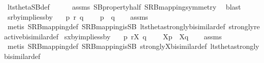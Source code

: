 \begin{isabellebody}
\ lts{\isacharunderscore}{\kern0pt}theta{\isachardot}{\kern0pt}SB{\isacharunderscore}{\kern0pt}def\isanewline
\ \ \ \ \isamarkupfalse%
\ assms\ SB{\isacharunderscore}{\kern0pt}property{\isacharunderscore}{\kern0pt}half\ SRB{\isacharunderscore}{\kern0pt}mapping{\isacharunderscore}{\kern0pt}symmetry\ \isamarkupfalse%
\ blast\isanewline
{}\isamarkupfalse%
%
\endisatagproof
{\isafoldproof}%
%
\isadelimproof
\isanewline
%
\endisadelimproof
\isanewline
{}\isamarkupfalse%
\ srby{\isacharunderscore}{\kern0pt}implies{\isacharunderscore}{\kern0pt}sby{\isacharcolon}{\kern0pt}\isanewline
\ \ \ {\isacartoucheopen}p\ {\isasymleftrightarrow}\isactrlsub r\ q{\isacartoucheclose}\ \isanewline
\ \ \ {\isacartoucheopen}{\isasymtheta}{\isacharparenleft}{\kern0pt}p{\isacharparenright}{\kern0pt}\ {\isasymleftrightarrow}\ {\isasymtheta}{\isacharparenleft}{\kern0pt}q{\isacharparenright}{\kern0pt}{\isacartoucheclose}\isanewline
%
\isadelimproof
\ \ %
\endisadelimproof
%
\isatagproof
{}\isamarkupfalse%
\ assms\isanewline
\ \ \isamarkupfalse%
\ {\isacharparenleft}{\kern0pt}metis\ SRB{\isacharunderscore}{\kern0pt}mapping{\isacharunderscore}{\kern0pt}def\ SRB{\isacharunderscore}{\kern0pt}mapping{\isacharunderscore}{\kern0pt}is{\isacharunderscore}{\kern0pt}SB\ lts{\isacharunderscore}{\kern0pt}theta{\isachardot}{\kern0pt}strongly{\isacharunderscore}{\kern0pt}bisimilar{\isacharunderscore}{\kern0pt}def\ strongly{\isacharunderscore}{\kern0pt}reactive{\isacharunderscore}{\kern0pt}bisimilar{\isacharunderscore}{\kern0pt}def{\isacharparenright}{\kern0pt}%
\endisatagproof
{\isafoldproof}%
%
\isadelimproof
\isanewline
%
\endisadelimproof
\isanewline
{}\isamarkupfalse%
\ sxby{\isacharunderscore}{\kern0pt}implies{\isacharunderscore}{\kern0pt}sby{\isacharcolon}{\kern0pt}\isanewline
\ \ \ {\isacartoucheopen}p\ {\isasymleftrightarrow}\isactrlsub r\isactrlsup X\ q{\isacartoucheclose}\ \isanewline
\ \ \ {\isacartoucheopen}{\isasymtheta}{\isacharbrackleft}{\kern0pt}X{\isacharbrackright}{\kern0pt}{\isacharparenleft}{\kern0pt}p{\isacharparenright}{\kern0pt}\ {\isasymleftrightarrow}\ {\isasymtheta}{\isacharbrackleft}{\kern0pt}X{\isacharbrackright}{\kern0pt}{\isacharparenleft}{\kern0pt}q{\isacharparenright}{\kern0pt}{\isacartoucheclose}\isanewline
%
\isadelimproof
\ \ %
\endisadelimproof
%
\isatagproof
{}\isamarkupfalse%
\ assms\isanewline
\ \ \isamarkupfalse%
\ {\isacharparenleft}{\kern0pt}metis\ SRB{\isacharunderscore}{\kern0pt}mapping{\isacharunderscore}{\kern0pt}def\ SRB{\isacharunderscore}{\kern0pt}mapping{\isacharunderscore}{\kern0pt}is{\isacharunderscore}{\kern0pt}SB\ strongly{\isacharunderscore}{\kern0pt}X{\isacharunderscore}{\kern0pt}bisimilar{\isacharunderscore}{\kern0pt}def\ lts{\isacharunderscore}{\kern0pt}theta{\isachardot}{\kern0pt}strongly{\isacharunderscore}{\kern0pt}bisimilar{\isacharunderscore}{\kern0pt}def{\isacharparenright}{\kern0pt}%

\end{isabellebody}
